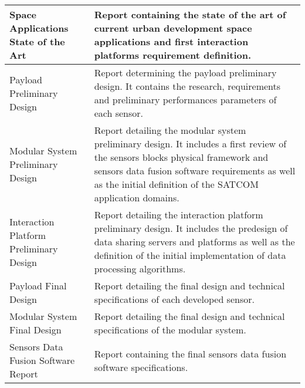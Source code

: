 \begin{longtable}[H]{>{\raggedright\arraybackslash}p{4cm} p{10cm}}
	\midrule

	Space Applications State of the Art & Report containing the state of the art of current urban development space applications and first interaction platforms requirement definition.\vspace{0.2cm} \\
	
	\midrule

	Payload Preliminary Design  & Report determining the payload preliminary design. It contains the research, requirements and preliminary performances parameters of each sensor.\vspace{0.2cm} \\
	
	\midrule

	Modular System Preliminary Design  & Report detailing the modular system preliminary design. It includes a first review of the sensors blocks physical framework and sensors data fusion software requirements as well as the initial definition of the SATCOM application domains.\vspace{0.2cm} \\
	
	\midrule

	Interaction Platform Preliminary Design  & Report detailing the interaction platform preliminary design. It includes the predesign of data sharing servers and platforms as well as the definition of the initial implementation of data processing algorithms.\vspace{0.2cm} \\
	
	\midrule
	
	Payload Final Design  & Report detailing the final design and technical specifications of each developed sensor.\vspace{0.2cm} \\
	
	\midrule

	Modular System  Final Design  & Report detailing the final design and technical specifications of the modular system.\vspace{0.2cm} \\ 
	
	\midrule

	Sensors Data Fusion Software Report  & Report containing the final sensors data fusion software specifications.\vspace{0.2cm} \\
	
	\midrule


\end{longtable}
